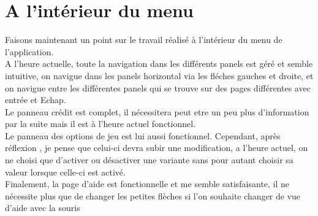 \documentclass[12pt, openany]{report}
\begin{document}
    \section{A l'intérieur du menu}
    Faisons maintenant un point sur le travail réalisé à l'intérieur du menu de l'application.\\
    A l'heure actuelle, toute la navigation dans les différents panels est géré et semble intuitive, on navigue dans les panels horizontal via les fléches gauches et droite, et on navigue entre les différentes panels qui se trouve sur des pages différentes avec entrée et Echap.\\
    Le panneau crédit est complet, il nécessitera peut etre un peu plus d'information par la suite mais il est à l'heure actuel fonctionnel.\\
    Le panneau des options de jeu est lui aussi fonctionnel. Cependant, après réflexion , je pense que celui-ci devra subir une modification, a l'heure actuel, on ne choisi que d'activer ou désactiver une variante sans pour autant choisir sa valeur lorsque celle-ci est activé.\\
    Finalement, la page d'aide est fonctionnelle et me semble satisfaisante, il ne nécessite plus que de changer les petites flèches si l'on souhaite changer de vue d'aide avec la souris
\end{document}
